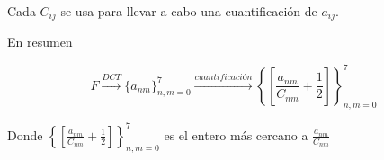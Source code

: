 			Cada $C_{ij}$ se usa para llevar a cabo una cuantificación de $a_{ij}$.


			\begin{framed}
				En resumen

				$$ F \xrightarrow{DCT} \{ a_{nm} \}^{7}_{n,m = 0} \xrightarrow{cuantificación} \left\{ \left[ \frac{a_{nm}}{C_{nm}} + \frac{1}{2} \right] \right\}^{7}_{n,m = 0} $$

				Donde $\left\{ \left[ \frac{a_{nm}}{C_{nm}} + \frac{1}{2} \right] \right\}^{7}_{n,m = 0}$ es el entero más cercano a $\frac{a_{nm}}{C_{nm}}$
			\end{framed}







